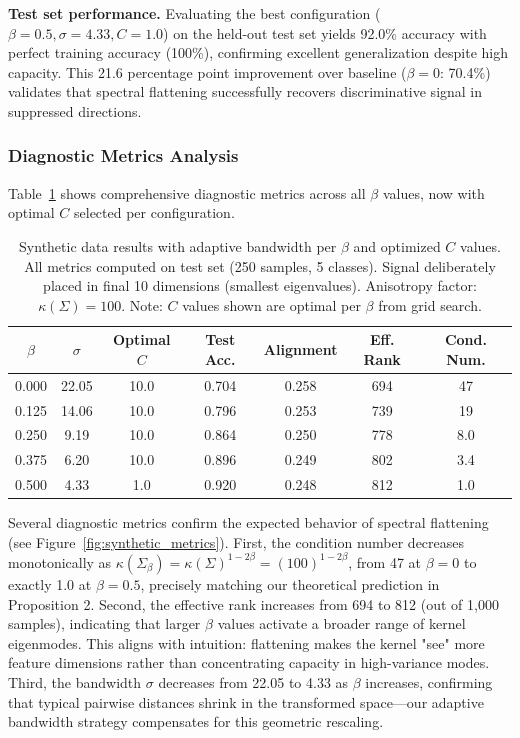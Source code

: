 \documentclass[11pt]{article}
\begin{document}
\textbf{Test set performance.} Evaluating the best configuration ($\beta=0.5, \sigma=4.33, C=1.0$) on the held-out test set yields 92.0\% accuracy with perfect training accuracy (100\%), confirming excellent generalization despite high capacity. This 21.6 percentage point improvement over baseline ($\beta=0$: 70.4\%) validates that spectral flattening successfully recovers discriminative signal in suppressed directions.

\subsubsection{Diagnostic Metrics Analysis}

Table~\ref{tab:synthetic_results} shows comprehensive diagnostic metrics across all $\beta$ values, now with optimal $C$ selected per configuration.

\begin{table}[h]
\centering
\caption{Synthetic data results with adaptive bandwidth per $\beta$ and optimized $C$ values. All metrics computed on test set (250 samples, 5 classes). Signal deliberately placed in final 10 dimensions (smallest eigenvalues). Anisotropy factor: $\kappa(\Sigma)=100$. Note: $C$ values shown are optimal per $\beta$ from grid search.}
\label{tab:synthetic_results}
\begin{tabular}{ccccccc}
\toprule
$\beta$ & $\sigma$ & Optimal $C$ & Test Acc. & Alignment & Eff. Rank & Cond. Num. \\
\midrule
0.000 & 22.05 & 10.0 & 0.704 & 0.258 & 694 & 47 \\
0.125 & 14.06 & 10.0 & 0.796 & 0.253 & 739 & 19 \\
0.250 & 9.19  & 10.0 & 0.864 & 0.250 & 778 & 8.0 \\
0.375 & 6.20  & 10.0 & 0.896 & 0.249 & 802 & 3.4 \\
0.500 & 4.33  & 1.0  & 0.920 & 0.248 & 812 & 1.0 \\
\bottomrule
\end{tabular}
\end{table}

Several diagnostic metrics confirm the expected behavior of spectral flattening (see Figure~\ref{fig:synthetic_metrics}). First, the condition number decreases monotonically as $\kappa(\Sigma_\beta) = \kappa(\Sigma)^{1-2\beta} = (100)^{1-2\beta}$, from 47 at $\beta=0$ to exactly 1.0 at $\beta=0.5$, precisely matching our theoretical prediction in Proposition 2. Second, the effective rank increases from 694 to 812 (out of 1,000 samples), indicating that larger $\beta$ values activate a broader range of kernel eigenmodes. This aligns with intuition: flattening makes the kernel "see" more feature dimensions rather than concentrating capacity in high-variance modes. Third, the bandwidth $\sigma$ decreases from 22.05 to 4.33 as $\beta$ increases, confirming that typical pairwise distances shrink in the transformed space---our adaptive bandwidth strategy compensates for this geometric rescaling.
\end{document}
